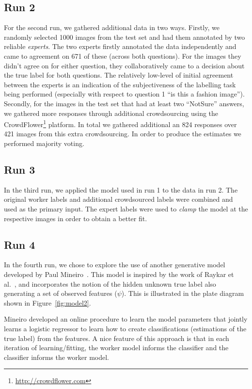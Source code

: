 \documentclass{../acm_proc_article-me11_tweaked}
\begin{document}
\subsection{Run 2}
For the second run, we gathered additional data in two ways. Firstly, we randomly selected 1000 images from the test set and had them annotated by two reliable \emph{experts}. The two experts firstly annotated the data independently and came to agreement on 671 of these (across both questions). For the images they didn't agree on for either question, they collaboratively came to a decision about the true label for both questions. The relatively low-level of initial agreement between the experts is an indication of the subjectiveness of the labelling task being performed (especially with respect to question 1 ``is this a fashion image''). Secondly, for the images in the test set that had at least two ``NotSure'' answers, we gathered more responses through additional crowdsourcing using the CrowdFlower\footnote{\url{http://crowdflower.com}} platform. In total we gathered additional an 824 responses over 421 images from this extra crowdsourcing. In order to produce the estimates we performed majority voting. 

\subsection{Run 3}
In the third run, we applied the model used in run 1 to the data in run 2. The original worker labels and additional crowdsourced labels were combined and used as the primary input. The expert labels were used to \emph{clamp} the model at the respective images in order to obtain a better fit.

\subsection{Run 4}
In the fourth run, we chose to explore the use of another generative model developed by Paul Mineiro~\cite{Mineiro20111116}. This model is inspired by the work of Raykar et al.~\cite{Raykar:2010:LC:1756006.1859894}, and incorporates the notion of the hidden unknown true label also generating a set of observed features ($\psi$). This is illustrated in the plate diagram shown in Figure~\ref{fig:model2}.

Mineiro developed an online procedure to learn the model parameters that jointly learns a logistic regressor to learn how to create classifications (estimations of the true label) from the features. A nice feature of this approach is that in each iteration of learning/fitting, the worker model informs the classifier and the classifier informs the worker model.
\end{document}
